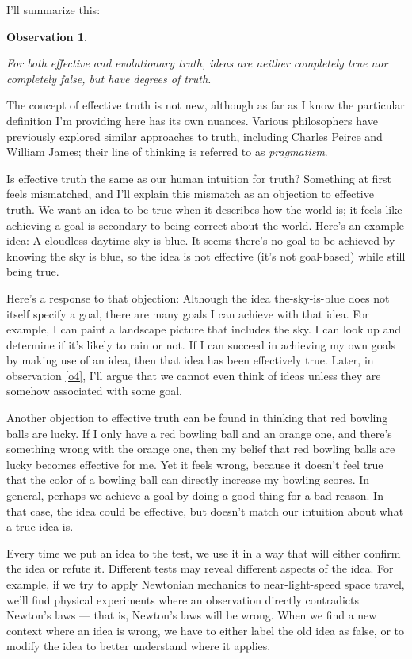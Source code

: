\documentclass[11pt, oneside]{article}
\newtheorem{obs}{Observation}
\theoremstyle{argtstyle}
\begin{document}
I'll summarize this:
\newcommand{\obstwo}{
    For both
    effective and evolutionary truth,
    ideas are neither completely true nor completely false, but have degrees of
    truth.
}
\begin{obs}\label{o2}
    \obstwo
\end{obs}

The concept of effective truth is not new, although as far as I know the
particular definition I'm providing here has its own nuances.
Various philosophers have previously
explored similar approaches to truth, including Charles Peirce and William
James; their line of thinking is referred to as {\em pragmatism}.

Is effective truth the same as our human intuition for truth?
Something at first feels mismatched, and I'll explain this mismatch as an
objection to effective truth.
We want an idea to be true when it describes how the world is;
it feels like achieving a goal is secondary to being
correct about the world.
Here's an example idea: A cloudless daytime sky is blue.
It seems there's no goal to be achieved by knowing the sky is blue,
so the idea is not effective (it's not goal-based) while
still being true.

Here's a response to that objection:
Although the idea the-sky-is-blue does not itself specify a goal, there
are many goals I can achieve with that idea. For example, I can paint a
landscape picture that includes the sky.
I can look up and determine if it's likely to rain or not.
If I can succeed in achieving my own goals by making use of an
idea, then that idea has been effectively true.
Later, in observation \ref{o4}, I'll argue that we cannot
even think of ideas
unless they are somehow associated with some goal.

Another objection to effective truth can be found in thinking that red bowling
balls are lucky.
If I only have a red bowling ball and an orange one,
and there's
something wrong with the orange one, then my belief that red bowling balls are
lucky becomes effective for me.
Yet it feels wrong, because it doesn't feel true
that the color of a bowling ball can directly increase my bowling scores.
In general, perhaps we achieve a goal by doing a good thing for a bad reason.
In that case, the idea could be effective, but doesn't match our intuition about
what a true idea is.

Every time we put an idea to the test, we use it in a way that will either
confirm the idea or refute it. Different tests may reveal different aspects of
the idea. For example, if we try to apply Newtonian mechanics to
near-light-speed space travel, we'll find physical experiments where an
observation directly contradicts Newton's laws --- that is, Newton's laws will
be wrong.
When we find a new context where an idea is wrong, we have to either
label the old idea as false, or to modify the idea to
better understand where it applies.
\end{document}
